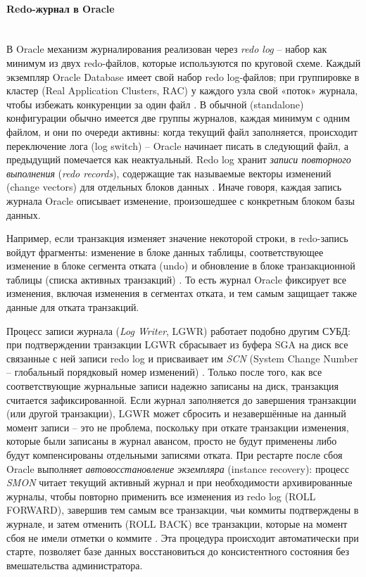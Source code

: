  \paragraph{Redo-журнал в Oracle} ~\\
 
 В Oracle механизм журналирования реализован через \textit{redo log} – набор как минимум из двух redo-файлов, которые используются по круговой схеме. Каждый экземпляр Oracle Database имеет свой набор redo log-файлов; при группировке в кластер (Real Application Clusters, RAC) у каждого узла свой «поток» журнала, чтобы избежать конкуренции за один файл \autocite{OracleRedoLog}. В обычной (standalone) конфигурации обычно имеется две группы журналов, каждая минимум с одним файлом, и они по очереди активны: когда текущий файл заполняется, происходит переключение лога (log switch) – Oracle начинает писать в следующий файл, а предыдущий помечается как неактуальный. Redo log хранит \textit{записи повторного выполнения} (\textit{redo records}), содержащие так называемые векторы изменений (change vectors) для отдельных блоков данных \autocite{OracleRedoLog}. Иначе говоря, каждая запись журнала Oracle описывает изменение, произошедшее с конкретным блоком базы данных. 
 
 Например, если транзакция изменяет значение некоторой строки, в redo-запись войдут фрагменты: изменение в блоке данных таблицы, соответствующее изменение в блоке сегмента отката (undo) и обновление в блоке транзакционной таблицы (списка активных транзакций) \autocite{OracleRedoLog}. То есть журнал Oracle фиксирует все изменения, включая изменения в сегментах отката, и тем самым защищает также данные для отката транзакций.
 
 Процесс записи журнала (\textit{Log Writer}, LGWR) работает подобно другим СУБД: при подтверждении транзакции LGWR сбрасывает из буфера SGA на диск все связанные с ней записи redo log и присваивает им \textit{SCN} (System Change Number – глобальный порядковый номер изменений) \autocite{OracleRedoLog}. Только после того, как все соответствующие журнальные записи надежно записаны на диск, транзакция считается зафиксированной. Если журнал заполняется до завершения транзакции (или другой транзакции), LGWR может сбросить и незавершённые на данный момент записи – это не проблема, поскольку при откате транзакции изменения, которые были записаны в журнал авансом, просто не будут применены либо будут компенсированы отдельными записями отката. При рестарте после сбоя Oracle выполняет \textit{автовосстановление экземпляра} (instance recovery): процесс \textit{SMON} читает текущий активный журнал и при необходимости архивированные журналы, чтобы повторно применить все изменения из redo log (ROLL FORWARD), завершив тем самым все транзакции, чьи коммиты подтверждены в журнале, и затем отменить (ROLL BACK) все транзакции, которые на момент сбоя не имели отметки о коммите \autocite{OracleRedoLog}. Эта процедура происходит автоматически при старте, позволяет базе данных восстановиться до консистентного состояния без вмешательства администратора.

